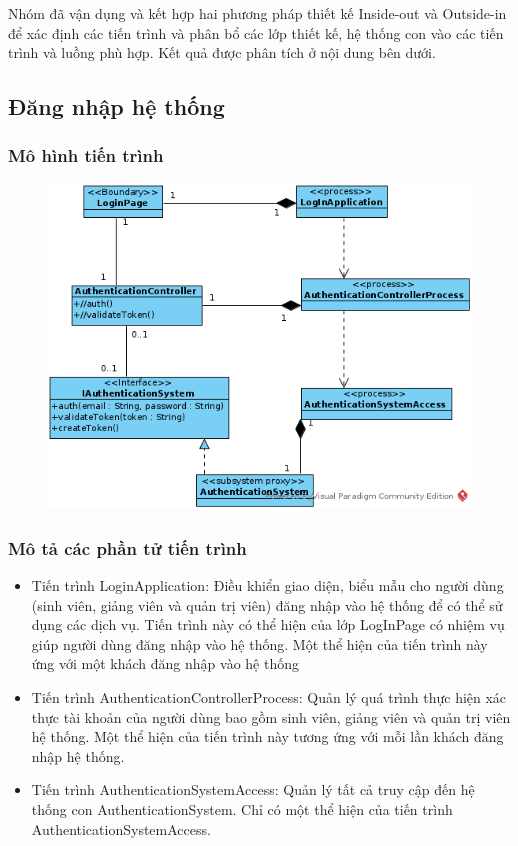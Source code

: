 \documentclass[./../main_file.tex]{subfiles}
\begin{document}
Nhóm đã vận dụng và kết hợp hai phương pháp thiết kế Inside-out và Outside-in để xác định các tiến trình và phân bổ các lớp thiết kế, hệ thống con vào các tiến trình và luồng phù hợp. Kết quả được phân tích ở nội dung bên dưới.

\subsection{Đăng nhập hệ thống}

\subsubsection{Mô hình tiến trình}

\begin{figure}[H]
	\centering
	\includegraphics[width=\linewidth]{./images/pv_login.png}
\end{figure}

\subsubsection{Mô tả các phần tử tiến trình}
\begin{itemize}
	\item Tiến trình LoginApplication: Điều khiển giao diện, biểu mẫu cho người dùng (sinh viên, giảng viên và quản trị viên) đăng nhập vào hệ thống để có thể sử dụng các dịch vụ. Tiến trình này có thể hiện của lớp LogInPage có nhiệm vụ giúp người dùng đăng nhập vào hệ thống.
	      Một thể hiện của tiến trình này ứng với một khách đăng nhập vào hệ thống
	\item Tiến trình AuthenticationControllerProcess: Quản lý quá trình thực hiện xác thực tài khoản của người dùng bao gồm sinh viên, giảng viên và quản trị viên hệ thống.
	      Một thể hiện của tiến trình này tương ứng với mỗi lần khách đăng nhập hệ thống.
	\item Tiến trình AuthenticationSystemAccess: Quản lý tất cả truy cập đến hệ thống con AuthenticationSystem.
	      Chỉ có một thể hiện của tiến trình AuthenticationSystemAccess.
\end{itemize}
\end{document}
